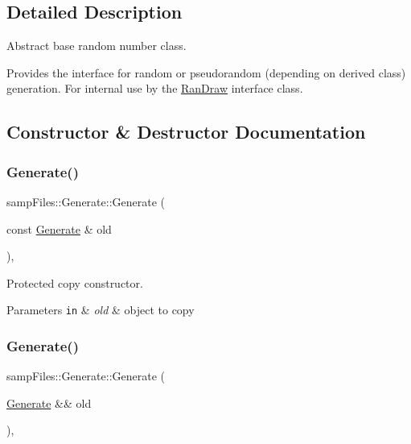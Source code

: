 \subsection{Detailed Description}
Abstract base random number class. 

Provides the interface for random or pseudorandom (depending on derived class) generation. For internal use by the {\ttfamily \hyperlink{classsamp_files_1_1_ran_draw}{Ran\+Draw}} interface class. 

\subsection{Constructor \& Destructor Documentation}
\mbox{\label{classsamp_files_1_1_generate_a3b9ea63228daca88614be36e796ffea1}} 
\subsubsection{\texorpdfstring{Generate()}{Generate()}\hspace{0.1cm}{\footnotesize\ttfamily [1/2]}}
{\footnotesize\ttfamily samp\+Files\+::\+Generate\+::\+Generate (\begin{DoxyParamCaption}\item[{const \hyperlink{classsamp_files_1_1_generate}{Generate} \&}]{old }\end{DoxyParamCaption})\hspace{0.3cm}{\ttfamily [inline]}, {\ttfamily [protected]}}



Protected copy constructor. 


\begin{DoxyParams}[1]{Parameters}
\mbox{\tt in}  & {\em old} & object to copy \\
\hline
\end{DoxyParams}
\mbox{\label{classsamp_files_1_1_generate_a12165e2b614b013d5eba3a893d298cea}} 
\subsubsection{\texorpdfstring{Generate()}{Generate()}\hspace{0.1cm}{\footnotesize\ttfamily [2/2]}}
{\footnotesize\ttfamily samp\+Files\+::\+Generate\+::\+Generate (\begin{DoxyParamCaption}\item[{\hyperlink{classsamp_files_1_1_generate}{Generate} \&\&}]{old }\end{DoxyParamCaption})\hspace{0.3cm}{\ttfamily [inline]}, {\ttfamily [protected]}}



